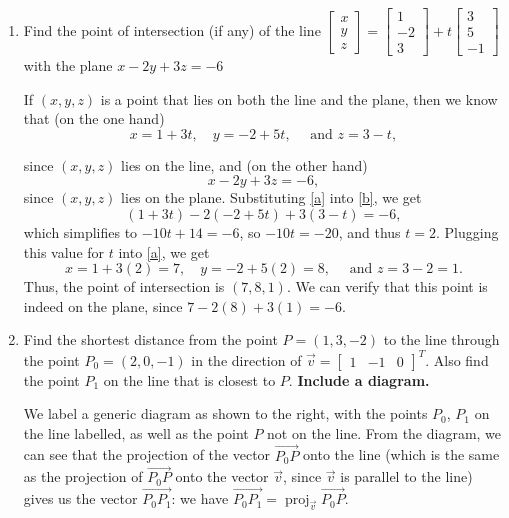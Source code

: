 \documentclass[12pt]{article}
\newcommand{\bbm}{\begin{bmatrix}}
\newcommand{\ebm}{\end{bmatrix}}
\DeclareMathOperator{\proj}{proj}
\begin{document}
\begin{enumerate}
 \item Find the point of intersection (if any) of the line $\bbm x\\y\\z\ebm = \bbm 1\\-2\\3\ebm+t\bbm 3\\5\\-1\ebm$ with the plane $x-2y+3z=-6$

\bigskip

If $(x,y,z)$ is a point that lies on both the line and the plane, then we know that (on the one hand)
\begin{equation}\label{a}
 x=1+3t, \quad y=-2+5t, \quad \text{ and } z=3-t,
\end{equation}

since $(x,y,z)$ lies on the line, and (on the other hand)
\begin{equation}\label{b}
 x-2y+3z=-6,
\end{equation}
since $(x,y,z)$ lies on the plane. Substituting \eqref{a} into \eqref{b}, we get
\[
 (1+3t)-2(-2+5t)+3(3-t)=-6,
\]
which simplifies to $-10t+14=-6$, so $-10t=-20$, and thus $t=2$. Plugging this value for $t$ into \eqref{a}, we get
\[
 x = 1+3(2) = 7,\quad y=-2+5(2) = 8, \quad \text{ and } z=3-2=1.
\]
Thus, the point of intersection is $(7,8,1)$. We can verify that this point is indeed on the plane, since $7-2(8)+3(1)=-6$.

\bigskip

\item Find the shortest distance from the point $P=(1,3,-2)$ to the line through the point $P_0 = (2,0,-1)$ in the direction of $\vec{v} = \bbm 1&-1&0\ebm^T$. Also find the point $P_1$ on the line that is closest to $P$. {\bf Include a diagram.}

\bigskip

\begin{multicols}{2}
 We label a generic diagram as shown to the right, with the points $P_0$, $P_1$ on the line labelled, as well as the point $P$ not on the line. From the diagram, we can see that the projection of the vector $\overrightarrow{P_0P}$ onto the line (which is the same as the projection of $\overrightarrow{P_0P}$ onto the vector $\vec{v}$, since $\vec{v}$ is parallel to the line) gives us the vector $\overrightarrow{P_0P_1}$: we have $\overrightarrow{P_0P_1} = \proj_{\vec{v}}\overrightarrow{P_0P}$.
\columnbreak


\end{multicols}
\end{enumerate}
\end{document}
